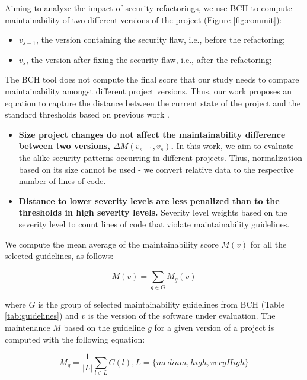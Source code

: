 \documentclass[10pt,conference]{IEEEtran}
\begin{document}
Aiming to analyze the impact of security refactorings, we use BCH to compute
maintainability of two different versions of the project (Figure
\ref{fig:commit}):
\begin{itemize}
	\item $v_{s-1}$, the version containing the security flaw, i.e., before the
	refactoring;
	\item $v_{s}$, the version after fixing the security flaw, i.e., after the
	refactoring;
\end{itemize}

The BCH tool does not compute the final score that our study needs to compare
maintainability amongst different project versions. Thus, our work proposes an
equation to capture the distance between the current state of the project and
the standard thresholds based on previous work \cite{Olivari:2018}.
\begin{itemize}
	\item \textbf{Size project changes do not affect the maintainability
	difference between two versions, $\Delta M (v_{s-1},v_{s})$.} In this work, we
	aim to evaluate the alike security patterns occurring in different projects.
	Thus, normalization based on its size cannot be used - we convert relative
	data to the respective number of lines of code.
	\item \textbf{Distance to lower severity levels are less penalized than to the
	thresholds in high severity levels.} Severity level weights based on the
	severity level to count lines of code that violate maintainability guidelines.
\end{itemize}

We compute the mean average of the maintainability score $M(v)$ for all the
selected guidelines, as follows:



\begin{equation}
    M(v) = \sum_{g \in G}^{} M_{g}(v)
\end{equation}

\noindent
where $G$ is the group of selected maintainability guidelines from BCH (Table
\ref{tab:guidelines}) and $v$ is the version of the software under evaluation.
The maintenance $M$ based on the guideline $g$ for a given version of a project
is computed with the following equation:

\begin{equation}
    M_{g} = \frac{1}{|L|} \sum_{l \in L}^{} C(l) , L = \{medium, high, veryHigh\}
\end{equation}
\end{document}
